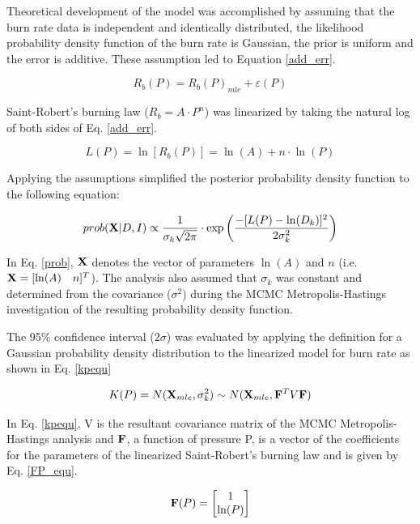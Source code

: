 \documentclass{article}
\begin{document}
Theoretical development of the model was accomplished by assuming that the burn rate data is independent and 
identically distributed, the likelihood probability density function of the burn rate is Gaussian, the prior 
is uniform and the error is additive. These assumption led to Equation \ref{add_err}. 

\begin{equation} \label{add_err}
R_b (P)=R_b (P)_{mle} + \varepsilon (P)
\end{equation}

Saint-Robert's burning law ($R_b=A \cdot P^n$) was linearized by taking the natural log of both sides of Eq. \ref{add_err}.

\begin{equation} \label{ln_st_rob}
L(P) = \ln [R_b(P)] = \ln (A) + n \cdot \ln (P)
\end{equation}

Applying the assumptions simplified the posterior probability density function to the following equation:

\begin{equation} \label{prob}
prob( \mathbf{X} |D, I) \propto \frac{1}{\sigma_k \sqrt{2 \pi} } \cdot \exp{\bigg( \frac{-[L(P)-\ln(D_k)]^2}{2\sigma_k^2} \bigg)}
\end{equation}

In Eq. \ref{prob}, $\mathbf{X}$ denotes the vector of parameters $\ln(A)$ and $n$ (i.e. $\mathbf{X}=[\ln(A) \quad n]^T$). 
The analysis also assumed that $\sigma_k$ was constant and determined from the covariance ($\sigma^2$) during the MCMC 
Metropolis-Hastings investigation of the resulting probability density function.

The 95\% confidence interval ($2\sigma$) was evaluated by applying the definition for a Gaussian probability density distribution 
to the linearized model for burn rate as shown in Eq. \ref{kpequ}

\begin{equation} \label{kpequ}
K(P)=N(\mathbf{X}_{mle},\sigma_k^2) \sim N(\mathbf{X}_{mle}, \mathbf{F}^T V \mathbf{F})
\end{equation}

In Eq. \ref{kpequ}, V is the resultant covariance matrix of the MCMC Metropolis-Hastings analysis and $\mathbf{F}$, a function of
pressure P, is a vector of the coefficients for the parameters of the linearized Saint-Robert's burning law and is given by
Eq. \ref{FP_equ}.

\begin{equation} \label{FP_equ}
\mathbf{F}(P)= 
\begin{bmatrix}
1 \\ 
\ln(P)
\end{bmatrix}
\end{equation}
\end{document}
